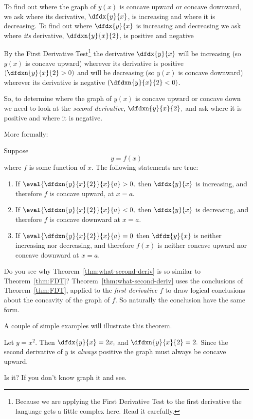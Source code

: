 To find out
where the graph of $y(x)$ is concave upward or concave downward, we ask where
its derivative, $\dfdx{y}{x}$, is increasing and where it is
decreasing. To find out where $\dfdx{y}{x}$ is increasing and
decreasing we ask where \emph{its} derivative, $\dfdxn{y}{x}{2}$, is
positive and negative

By the First Derivative Test\footnote{Because we are applying the
  First Derivative Test to the first derivative the language gets a
  little complex here. Read it carefully.} the derivative
$\dfdx{y}{x}$ will be increasing (so $y(x)$ is concave
upward) wherever \alert{its} derivative is positive
$\left(\dfdxn{y}{x}{2}>0\right)$ and will be decreasing (so $y(x)$ is
concave downward) wherever its derivative is negative
$\left(\dfdxn{y}{x}{2}<0\right)$.

So, to determine where the graph of $y(x)$ is concave upward or concave
down we need to look at the \emph{second derivative,}
$\dfdxn{y}{x}{2},$ and ask where it is positive and where it is
negative.

More formally:

\begin{mytheorem}[Concavity]
  \label{thm:what-second-deriv}
  Suppose $$y=f(x)$$ where $f$ is some function  of $x.$
  The following statements are true:
  \begin{enumerate}
  \item If $\eval{\dfdxn{y}{x}{2}}{x}{a}>0,$ then $\dfdx{y}{x}$ is
    increasing, and therefore $f$ is concave upward, at
    $x=a$. 
  \item If $\eval{\dfdxn{y}{x}{2}}{x}{a}<0,$ then $\dfdx{y}{x}$ is
    decreasing, and therefore $f$ is concave downward at
    $x=a$. 
  \item If $\eval{\dfdxn{y}{x}{2}}{x}{a}=0$ then $\dfdx{y}{x}$ is
    neither increasing nor decreasing, and therefore $f(x)$ is neither
    concave upward nor concave downward at $x=a$.
  \end{enumerate}
\end{mytheorem}

Do you see why Theorem~\ref{thm:what-second-deriv} is so similar to
Theorem~\ref{thm:FDT}? Theorem~\ref{thm:what-second-deriv} uses the
conclusions of Theorem~\ref{thm:FDT}, applied to the \emph{first
  derivative $f$} to draw logical conclusions about the concavity of
the graph of $f.$ So naturally the conclusion have the same form.

A couple of simple examples will illustrate this theorem.
\begin{myexample}
  Let $y=x^2.$ Then $\dfdx{y}{x}=2x,$ and $\dfdxn{y}{x}{2}=2.$ Since
  the second derivative of $y$ is \emph{always} positive the graph
  must always be concave upward.

  \begin{ProficiencyDrill}
    Is it? If you don't know graph it and see.
  \end{ProficiencyDrill}
\end{myexample}

